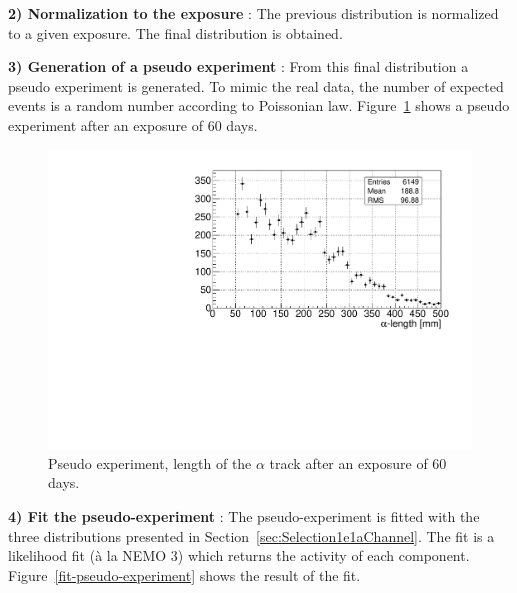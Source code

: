 \documentclass[main.tex]{subfiles}
\begin{document}
\bigskip


\noindent \textbf{2) Normalization to the exposure} : The previous distribution is normalized to a given exposure. The final distribution is obtained.


\bigskip


\noindent \textbf{3) Generation of a pseudo experiment} : From this final distribution a pseudo experiment is generated. To mimic the real data, the number of expected events is a random number according to Poissonian law. Figure~\ref{pseudo-experiment} shows a pseudo experiment after an exposure of 60 days.


\begin{figure}[h!]
\begin{center}
\includegraphics[scale=0.55]{pictures/Chap5/alph_length_exposure_60.pdf}
\caption{Pseudo experiment, length of the $\alpha$ track after an exposure of 60 days.}
\label{pseudo-experiment}
\end{center}
\end{figure}


\bigskip


\noindent \textbf{4) Fit the pseudo-experiment} : The pseudo-experiment is fitted with the three distributions presented in Section~\ref{sec:Selection1e1aChannel}. The fit is a likelihood fit (\`a la NEMO 3) which returns the activity of each component. Figure~\ref{fit-pseudo-experiment} shows the result of the fit.
\end{document}
